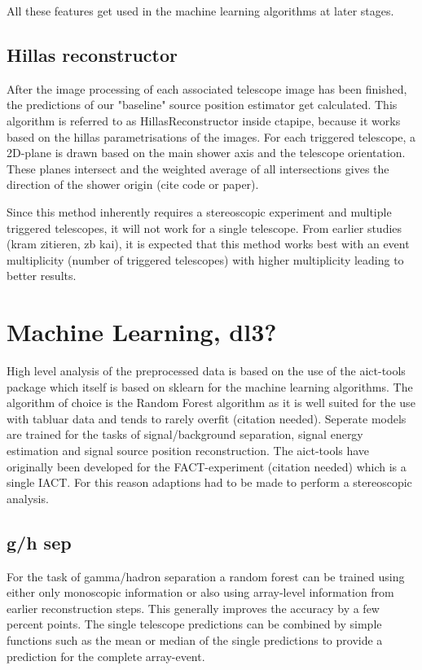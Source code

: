 All these features get used in the machine learning algorithms at later stages.

\subsection{Hillas reconstructor}  %
After the image processing of each associated telescope image has been finished,
the predictions of our "baseline" source position estimator get calculated.
This algorithm is referred to as HillasReconstructor inside ctapipe, because 
it works based on the hillas parametrisations of the images.
For each triggered telescope, a 2D-plane is drawn based on the main shower 
axis and the telescope orientation. These planes intersect and 
the weighted average of all intersections gives the 
direction of the shower origin (cite code or paper).


Since this method inherently requires a stereoscopic experiment
and multiple triggered telescopes, it will not work for a single telescope.
From earlier studies (kram zitieren, zb kai), it is expected
that this method works best with an event multiplicity 
(number of triggered telescopes)  with higher multiplicity
leading to better results.

\section{Machine Learning, dl3?}
High level analysis of the preprocessed data is based on the use of
the aict-tools \cite{aict-tools} package which itself is based on
sklearn \cite{sklearn_api} for the machine learning algorithms.
The algorithm of choice is the Random Forest algorithm
as it is well suited for the use with tabluar data and tends to rarely overfit
(citation needed).
Seperate models are trained for the tasks of signal/background
separation, signal energy estimation and signal source position
reconstruction.
The aict-tools have originally been developed for the FACT-experiment
(citation needed) which is a single IACT. For this reason
adaptions had to be made to perform a stereoscopic analysis.


\subsection{g/h sep}
For the task of gamma/hadron separation a random forest can be trained
using either only monoscopic information or also using array-level
information from earlier reconstruction steps.
This generally improves the accuracy by a few percent points.
The single telescope predictions can be combined by
simple functions such as the mean or median of the
single predictions to provide a prediction for the complete
array-event.


